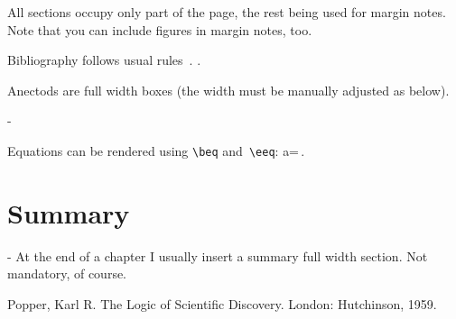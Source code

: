 All sections occupy only part of the page, the rest being used for margin notes. Note that you can include figures in margin notes, too. 
\lipsum[5]

Bibliography follows usual rules~\cite{Popper, 1959}. \lipsum[6].

Anectods are full width boxes (the width must be manually adjusted as below).
\begin{adjmulticols}{1}{0pt}{-\marginparwidth}
\begin{anecdote}[frametitle=The evolution of cosmology]
\lipsum[7-8]
\end{anecdote}
\end{adjmulticols}
Equations can be rendered using {\tt \textbackslash{beq}} and~{\tt \textbackslash{eeq}}:
\beq\label{eq:a.eq.f.over.m}
a=\,.
\eeq
\lipsum[9-10]

\lipsum[12-13]

\lipsum[14-15]

\chapter*{Summary}
\begin{adjmulticols}{2}{0pt}{-\marginparwidth}
At the end of a chapter I usually insert a summary full width section. Not mandatory, of course.

\lipsum[11]
\end{adjmulticols}

\begin{thebibliography}{99}
Popper, Karl R. The Logic of Scientific Discovery. London: Hutchinson, 1959.
\end{thebibliography}
